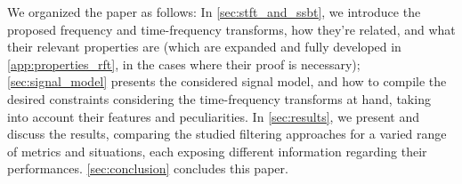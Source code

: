 We organized the paper as follows:
In \cref{sec:stft_and_ssbt}, we introduce the proposed frequency and time-frequency transforms, how they're related, and what their relevant properties are (which are expanded and fully developed in \cref{app:properties_rft}, in the cases where their proof is necessary);
\cref{sec:signal_model} presents the considered signal model, and how to compile the desired constraints considering the time-frequency transforms at hand, taking into account their features and peculiarities.
In \cref{sec:results}, we present and discuss the results, comparing the studied filtering approaches for a varied range of metrics and situations, each exposing different information regarding their performances.
\cref{sec:conclusion} concludes this paper.